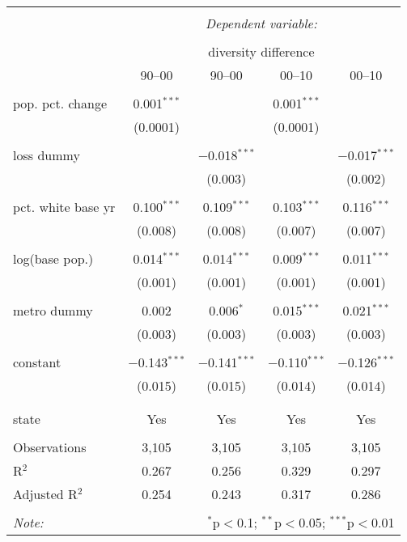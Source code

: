 \documentclass[12pt]{article}
\begin{document}
\begin{table}[p] \centering 
\begin{tabular}{@{\extracolsep{5pt}}lcccc} 
\\[-1.8ex]\hline 
\hline \\[-1.8ex] 
 & \multicolumn{4}{c}{\textit{Dependent variable:}} \\ 
\cline{2-5} 
\\[-1.8ex] & \multicolumn{4}{c}{diversity difference} \\ 
 & 90--00 & 90--00 & 00--10 & 00--10 \\ 
\hline \\[-1.8ex] 
 pop. pct. change & 0.001$^{***}$ &  & 0.001$^{***}$ &  \\ 
  & (0.0001) &  & (0.0001) &  \\ 
  & & & & \\ 
 loss dummy &  & $-$0.018$^{***}$ &  & $-$0.017$^{***}$ \\ 
  &  & (0.003) &  & (0.002) \\ 
  & & & & \\ 
 pct. white base yr & 0.100$^{***}$ & 0.109$^{***}$ & 0.103$^{***}$ & 0.116$^{***}$ \\ 
  & (0.008) & (0.008) & (0.007) & (0.007) \\ 
  & & & & \\ 
 log(base pop.) & 0.014$^{***}$ & 0.014$^{***}$ & 0.009$^{***}$ & 0.011$^{***}$ \\ 
  & (0.001) & (0.001) & (0.001) & (0.001) \\ 
  & & & & \\ 
 metro dummy & 0.002 & 0.006$^{*}$ & 0.015$^{***}$ & 0.021$^{***}$ \\ 
  & (0.003) & (0.003) & (0.003) & (0.003) \\ 
  & & & & \\ 
 constant & $-$0.143$^{***}$ & $-$0.141$^{***}$ & $-$0.110$^{***}$ & $-$0.126$^{***}$ \\ 
  & (0.015) & (0.015) & (0.014) & (0.014) \\ 
  & & & & \\ 
\hline \\[-1.8ex] 
state & Yes & Yes & Yes & Yes \\ 
\hline \\[-1.8ex] 
Observations & 3,105 & 3,105 & 3,105 & 3,105 \\ 
R$^{2}$ & 0.267 & 0.256 & 0.329 & 0.297 \\ 
Adjusted R$^{2}$ & 0.254 & 0.243 & 0.317 & 0.286 \\ 
\hline 
\hline \\[-1.8ex] 
\textit{Note:}  & \multicolumn{4}{r}{$^{*}$p$<$0.1; $^{**}$p$<$0.05; $^{***}$p$<$0.01} \\ 
\end{tabular} 
\end{table} 
\end{document}
